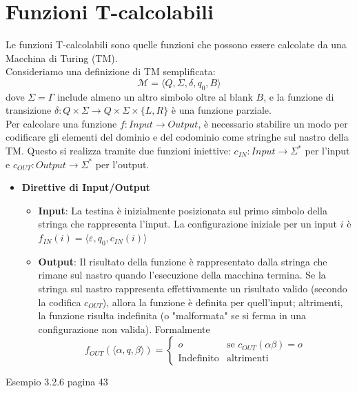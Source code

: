 \documentclass[12pt, a4paper]{report}
\begin{document}
        \section{Funzioni T-calcolabili}
            Le funzioni T-calcolabili sono quelle funzioni che possono essere calcolate da una Macchina di Turing (TM).\\
            Consideriamo una definizione di TM semplificata: 
            $$\mathcal{M}=\langle Q,\Sigma,\delta,q_0,B\rangle$$
            dove $\Sigma=\Gamma$ include almeno un altro simbolo oltre al blank $B$, e la funzione di transizione $\delta : Q \times \Sigma \to Q \times \Sigma \times \{L,R\}$ è una funzione parziale.\\
            Per calcolare una funzione $f : Input \to Output$, è necessario stabilire un modo per codificare gli elementi del dominio e del codominio come stringhe sul nastro della TM. Questo si realizza tramite due funzioni iniettive: $c_{IN} : Input \to \Sigma^*$ per l'input e $c_{OUT} : Output \to \Sigma^*$ per l'output.
            \begin{itemize}
                \item \textbf{Direttive di Input/Output} \begin{itemize}
                    \item \textbf{Input}: La testina è inizialmente posizionata sul primo simbolo della stringa che rappresenta l'input. La configurazione iniziale per un input $i$ è $f_{IN}(i) = \langle \varepsilon, q_0, c_{IN}(i) \rangle$
                    \item \textbf{Output}: Il risultato della funzione è rappresentato dalla stringa che rimane sul nastro quando l'esecuzione della macchina termina. Se la stringa sul nastro rappresenta effettivamente un risultato valido (secondo la codifica $c_{OUT}$), allora la funzione è definita per quell'input; altrimenti, la funzione risulta indefinita (o "malformata" se si ferma in una configurazione non valida). Formalmente $$f_{OUT}(\langle\alpha,q,\beta\rangle)=\begin{cases}
                        o & \text{se } c_{OUT}(\alpha\beta)=o\\
                        \text{Indefinito} & \text{altrimenti}
                    \end{cases}$$
                \end{itemize}
            \end{itemize}
            \begin{example}
                Esempio 3.2.6 pagina 43
            \end{example}
\end{document}
